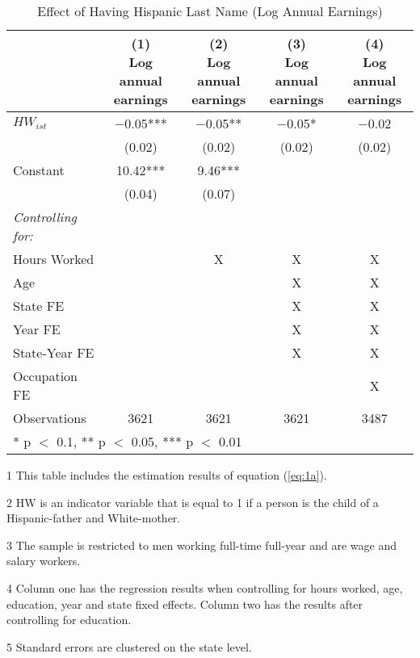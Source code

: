 \begin{table}[H]
\centering\centering
\caption{Effect of Having Hispanic Last Name (Log Annual Earnings) \label{tab:lastnamereg-occ}}
\centering
\begin{threeparttable}
\begin{tabular}[t]{lcccc}
\toprule
  & \specialcell{(1) \\ Log annual \\ earnings} & \specialcell{(2) \\ Log annual \\ earnings} & \specialcell{(3) \\ Log annual \\ earnings} & \specialcell{(4) \\  Log annual \\ earnings}\\
\midrule
$HW_{ist}$ & \num{-0.05}*** & \num{-0.05}** & \num{-0.05}* & \num{-0.02}\\
 & (\num{0.02}) & (\num{0.02}) & (\num{0.02}) & (\num{0.02})\\
Constant & \num{10.42}*** & \num{9.46}*** &  & \\
 & (\num{0.04}) & (\num{0.07}) &  & \\
\midrule
\textit{Controlling for:} &  &  &  & \\
Hours Worked &  & X & X & X\\
Age &  &  & X & X\\
State FE &  &  & X & X\\
Year FE &  &  & X & X\\
State-Year FE &  &  & X & X\\
Occupation FE &  &  &  & X\\
Observations & \num{3621} & \num{3621} & \num{3621} & \num{3487}\\
\bottomrule
\multicolumn{5}{l}{\rule{0pt}{1em}* p $<$ 0.1, ** p $<$ 0.05, *** p $<$ 0.01}\\
\end{tabular}
\begin{tablenotes}
\item[1] {\footnotesize{This table includes the estimation results of equation (\ref{eq:1a}).}}
\item[2] {\footnotesize{HW is an indicator variable that is equal to 1 if a person is the child of a Hispanic-father and White-mother.}}
\item[3] {\footnotesize{The sample is restricted to men working full-time full-year and are wage and salary workers.}}
\item[4] {\footnotesize{Column one has the regression results when controlling for hours worked, age, education, year and state fixed effects. Column two has the results after controlling for education.}}
\item[5] {\footnotesize{Standard errors are clustered on the state level.}}
\end{tablenotes}
\end{threeparttable}
\end{table}
